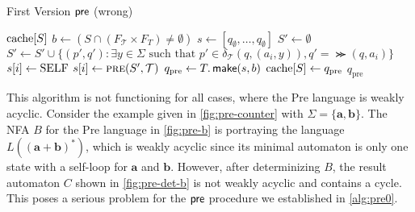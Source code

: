 \begin{algorithm}
\caption{First Version $\operatorname{\textsf{pre}}$ (wrong)}\label{alg:pre0}
\begin{algorithmic}[1]
\If{$\cache[S]$}		
\Return $\cache[S]$		
\EndIf
\State $b \gets (S \cap (F_{\mathcal{T}} \times F_{T} ) \neq \emptyset)$ 
\State $s \gets [q_{\emptyset},\dots,q_{\emptyset}]$
\State $S' \gets \emptyset$ 	%
\State $S' \gets S' \cup \{(p',q'): \exists y \in \Sigma \text{ such that } p' \in \delta_{\mathcal{T}}(q,(a_{i},y)), q' = \Succ(q,a_{i})\}$
\EndFor
{}	
\State $s[i] \gets \mathrm{SELF}$	
\Else
\State $s[i] \gets \Call{pre}{S',\mathcal{T}}$	
\EndIf
\EndFor
\State $q_{\text{pre}} \gets T.\operatorname{\textsf{make}}(s,b)$	
\State $\mathrm{cache}[S] \gets q_{\text{pre}}$		
\Return $q_{\text{pre}} $
\EndProcedure
\end{algorithmic}
\end{algorithm}

This algorithm is not functioning for all cases, where the Pre language is weakly acyclic. Consider the example given in \autoref{fig:pre-counter} with $\Sigma = \{\bm{a},\bm{b}\}$. The NFA $B$ for the Pre language in \autoref{fig:pre-b} is portraying the language $L(\bm{(a+b)^{*}})$, which is weakly acyclic since its minimal automaton is only one state with a self-loop for $\bm{a}$ and $\bm{b}$. However, after determinizing $B$, the result automaton $C$ shown in \autoref{fig:pre-det-b} is not weakly acyclic and contains a cycle. This poses a serious problem for the $\operatorname{\textsf{pre}}$ procedure we established in \autoref{alg:pre0}.

